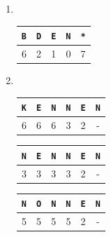 \documentclass[11pt,a4paper]{article}
\begin{document}
\begin{loesung}
    \begin{enumerate}
        \item \ \\
        \begin{table}[h!]
            \centering
            \begin{tabular}{|c|c|c|c|c|}
                \hline
                \texttt{B} &\texttt{D} &\texttt{E} &\texttt{N} &\texttt{*} \\
                \hline
                6 & 2 & 1 & 0 & 7 \\
                \hline
            \end{tabular}
        \end{table}
        \FloatBarrier

        \item \ \\
        \begin{table}[h!]
            \centering
            \parbox{0.25\linewidth}{
                \centering
                \begin{tabular}{|c|c|c|c|c|c|}
                    \hline
                    \texttt{K} & \texttt{E} & \texttt{N} & \texttt{N} & \texttt{E} & \texttt{N} \\
                    \hline
                    6 & 6 & 6 & 3 & 2 & - \\
                    \hline
                \end{tabular}
            }
            \parbox{0.25\linewidth}{
                \centering
                \begin{tabular}{|c|c|c|c|c|c|}
                    \hline
                    \texttt{N} & \texttt{E} & \texttt{N} & \texttt{N} & \texttt{E} & \texttt{N} \\
                    \hline
                    3 & 3 & 3 & 3 & 2 & - \\
                    \hline
                \end{tabular}
            }
            \parbox{0.25\linewidth}{
                \centering
                \begin{tabular}{|c|c|c|c|c|c|}
                    \hline
                    \texttt{N} & \texttt{O} & \texttt{N} & \texttt{N} & \texttt{E} & \texttt{N} \\
                    \hline
                    5 & 5 & 5 & 5 & 2 & - \\
                    \hline
                \end{tabular}
}
\end{table}
\end{enumerate}
\end{loesung}
\end{document}
